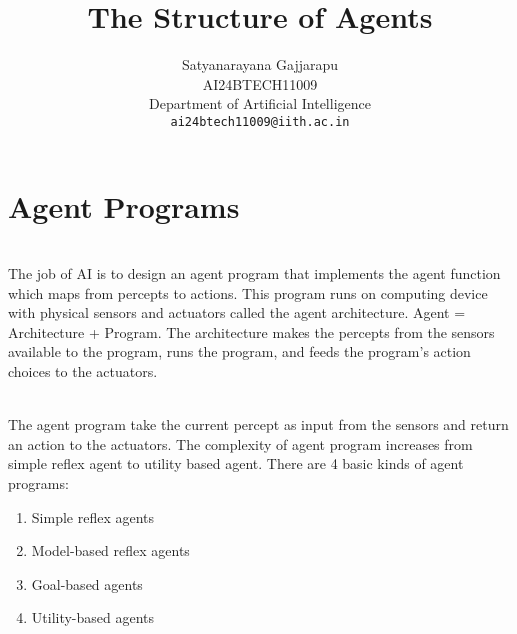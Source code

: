 \documentclass{article}
\title{The Structure of Agents}
\author{%
Satyanarayana Gajjarapu \\
AI24BTECH11009 \\
Department of Artificial Intelligence \\
\texttt{ai24btech11009@iith.ac.in} \\
}
\begin{document}
\maketitle
\section{Agent Programs}
\begin{paragraph}
\\
The job of AI is to design an agent program that implements the agent function which maps from percepts to actions. This program runs on computing device with physical sensors and actuators called the agent architecture. Agent = Architecture + Program. The architecture makes the percepts from the sensors available to the program, runs the program, and feeds the program’s action choices to the actuators. 
\end{paragraph}
\begin{paragraph}
\\
The agent program take the current percept as input from the sensors and return an action to the actuators. The complexity of agent program increases from simple reflex agent to utility based agent. There are 4 basic kinds of agent programs:
\begin{enumerate}
    \item Simple reflex agents
\item  Model-based reflex agents
\item  Goal-based agents
\item  Utility-based agents
\end{enumerate}
\end{paragraph}
\end{document}
